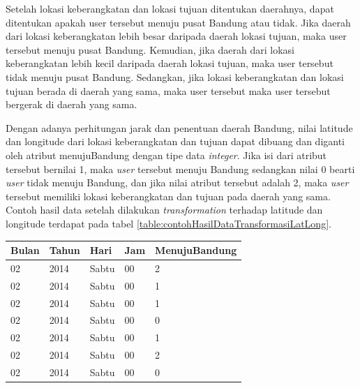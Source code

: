 Setelah lokasi keberangkatan dan lokasi tujuan ditentukan daerahnya, dapat ditentukan apakah user tersebut menuju pusat Bandung atau tidak. Jika daerah dari lokasi keberangkatan lebih besar daripada daerah lokasi tujuan, maka user tersebut menuju pusat Bandung. Kemudian, jika daerah dari lokasi keberangkatan lebih kecil daripada daerah lokasi tujuan, maka user tersebut tidak menuju pusat Bandung. Sedangkan, jika lokasi keberangkatan dan lokasi tujuan berada di daerah yang sama, maka user tersebut maka user tersebut bergerak di daerah yang sama.

Dengan adanya perhitungan jarak dan penentuan daerah Bandung, nilai latitude dan longitude dari lokasi keberangkatan dan tujuan dapat dibuang dan diganti oleh atribut menujuBandung dengan tipe data \textsl{integer}. Jika isi dari atribut tersebut bernilai 1, maka \textsl{user} tersebut menuju Bandung sedangkan nilai 0 bearti \textsl{user} tidak menuju Bandung, dan jika nilai atribut tersebut adalah 2, maka \textsl{user} tersebut memiliki lokasi keberangkatan dan tujuan pada daerah yang sama. Contoh hasil data setelah dilakukan \textsl{transformation} terhadap latitude dan longitude terdapat pada tabel \ref{table:contohHasilDataTransformasiLatLong}.

\begin{table}[H]
\caption{Contoh hasil data transformasi latitude longitude}
\label{table:contohHasilDataTransformasiLatLong}
\begin{longtable}{|l|l|l|l|l|}
\hline
\textbf{Bulan}	& \textbf{Tahun} 	& \textbf{Hari} & \textbf{Jam}	& \textbf{MenujuBandung} \\ \hline
02								& 2014						& Sabtu         & 00         	& 2                    \\ \hline
02								& 2014						& Sabtu         & 00         	& 1        					  \\ \hline
02								& 2014						& Sabtu         & 00         	& 1       							\\ \hline
02								& 2014						& Sabtu         & 00         	& 0         						\\ \hline
02								& 2014						& Sabtu         & 00         	& 1          					\\ \hline
02								& 2014						& Sabtu         & 00         	& 2      							\\ \hline
02								& 2014						& Sabtu         & 00         	& 0       							\\ \hline
\end{longtable}
\end{table} 


